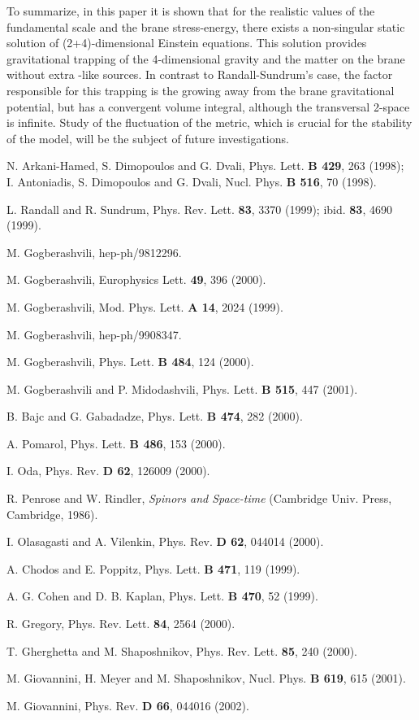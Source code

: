 \documentclass[a4paper,a4paper]{article}
\begin{document}
To summarize, in this paper it is shown that for the realistic
values of the fundamental scale and the brane stress-energy, there
exists a non-singular static solution of (2+4)-dimensional
Einstein equations. This solution provides gravitational trapping
of the 4-dimensional gravity and the matter on the brane without
extra \myHighlight{$\delta$}\coordHE{}-like sources. In contrast to Randall-Sundrum's
case, the factor responsible for this trapping is the growing
away from the brane gravitational potential, but has a convergent
volume integral, although the transversal 2-space is infinite.
Study of the fluctuation of the metric, which is crucial for the
stability of the model, will be the subject of future
investigations.

\begin{thebibliography}{17}

 N. Arkani-Hamed, S. Dimopoulos and G. Dvali,
Phys. Lett. {\bf B 429}, 263 (1998);
\\
I. Antoniadis, S. Dimopoulos and G. Dvali,
Nucl. Phys. {\bf B 516}, 70 (1998).

 L. Randall and R. Sundrum,
Phys. Rev. Lett. {\bf 83}, 3370 (1999); ibid. {\bf 83}, 4690 (1999).

 M. Gogberashvili, hep-ph/9812296.

 M. Gogberashvili,
Europhysics Lett. {\bf 49}, 396 (2000).

 M. Gogberashvili,
Mod. Phys. Lett. {\bf A 14}, 2024 (1999).

 M. Gogberashvili, hep-ph/9908347.

 M. Gogberashvili,
Phys. Lett. {\bf B 484}, 124 (2000).

 M. Gogberashvili and P. Midodashvili,
Phys. Lett. {\bf B 515}, 447 (2001).

 B. Bajc and G. Gabadadze,
Phys. Lett. {\bf B 474}, 282 (2000).

 A. Pomarol,
Phys. Lett. {\bf B 486}, 153 (2000).

 I. Oda,
Phys. Rev. {\bf D 62}, 126009 (2000).

 R. Penrose and W. Rindler,
{\it Spinors and Space-time} (Cambridge Univ. Press, Cambridge,
1986).

 I. Olasagasti and A. Vilenkin,
Phys. Rev. {\bf D 62}, 044014 (2000).

 A. Chodos and E. Poppitz,
Phys. Lett. {\bf B 471}, 119 (1999).

 A. G. Cohen and D. B. Kaplan,
Phys. Lett. {\bf B 470}, 52 (1999).

 R. Gregory,
Phys. Rev. Lett. {\bf 84}, 2564 (2000).

 T. Gherghetta and M. Shaposhnikov,
Phys. Rev. Lett. {\bf 85}, 240 (2000).

 M. Giovannini, H. Meyer and M. Shaposhnikov,
Nucl. Phys. {\bf B 619}, 615 (2001).

 M. Giovannini,
Phys. Rev. {\bf D 66}, 044016 (2002).

\end{thebibliography}
\end{document}
